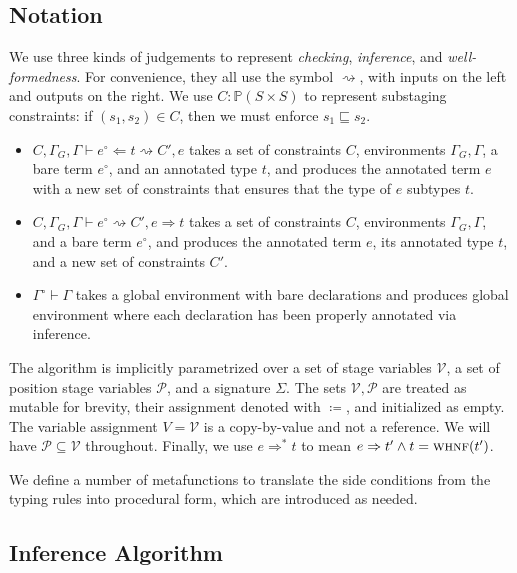 \documentclass[sigplan,10pt,anonymous,review]{acmart}
\begin{document}
\subsection{Notation}

We use three kinds of judgements to represent \textit{checking}, \textit{inference}, and \textit{well-formed\-ness}. For convenience, they all use the symbol $\rightsquigarrow$, with inputs on the left and outputs on the right. We use $C : \mathbb{P}(S \times S)$ to represent substaging constraints: if $(s_1, s_2) \in C$, then we must enforce $s_1 \sqsubseteq s_2$.
\begin{itemize}
    \item $C, \Gamma_G, \Gamma \vdash e^\circ \Leftarrow t \rightsquigarrow C', e$ takes a set of constraints $C$, environments $\Gamma_G, \Gamma$, a bare term $e^\circ$, and an annotated type $t$, and produces the annotated term $e$ with a new set of constraints that ensures that the type of $e$ subtypes $t$.
    \item $C, \Gamma_G, \Gamma \vdash e^\circ \rightsquigarrow C', e \Rightarrow t$ takes a set of constraints $C$, environments $\Gamma_G, \Gamma$, and a bare term $e^\circ$, and produces the annotated term $e$, its annotated type $t$, and a new set of constraints $C'$.
    \item $\Gamma^\circ \vdash \Gamma$ takes a global environment with bare declarations and produces global environment where each declaration has been properly annotated via inference.
\end{itemize}

The algorithm is implicitly parametrized over a set of stage variables $\mathcal{V}$, a set of position stage variables $\mathcal{P}$, and a signature $\Sigma$. The sets $\mathcal{V}, \mathcal{P}$ are treated as mutable for brevity, their assignment denoted with $\coloneqq$, and initialized as empty. The variable assignment $V = \mathcal{V}$ is a copy-by-value and not a reference. We will have $\mathcal{P} \subseteq \mathcal{V}$ throughout. Finally, we use $e \Rightarrow^* t$ to mean $e \Rightarrow t' \wedge t = \textsc{whnf}(t')$.

We define a number of metafunctions to translate the side conditions from the typing rules into procedural form, which are introduced as needed.

\subsection{Inference Algorithm}
\end{document}
